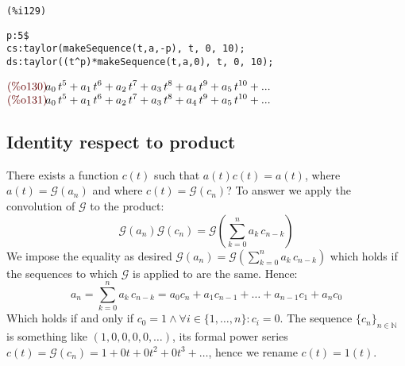 \noindent
\begin{minipage}[t]{8ex}{\color{red}\bf
\begin{verbatim}
(%i129) 
\end{verbatim}}
\end{minipage}
\begin{minipage}[t]{\textwidth}{\color{blue}
\begin{verbatim}
p:5$
cs:taylor(makeSequence(t,a,-p), t, 0, 10);
ds:taylor((t^p)*makeSequence(t,a,0), t, 0, 10);
\end{verbatim}}
\end{minipage}
\begin{math}\displaystyle
\parbox{8ex}{\color{labelcolor}(\%o130) }
{a}_{0}\,{t}^{5}+{a}_{1}\,{t}^{6}+{a}_{2}\,{t}^{7}+{a}_{3}\,{t}^{8}+{a}_{4}\,{t}^{9}+{a}_{5}\,{t}^{10}+...
\end{math}\\
\begin{math}\displaystyle
  \parbox{8ex}{\color{labelcolor}(\%o131) }
  {a}_{0}\,{t}^{5}+{a}_{1}\,{t}^{6}+{a}_{2}\,{t}^{7}+{a}_{3}\,{t}^{8}+{a}_{4}\,{t}^{9}+{a}_{5}\,{t}^{10}+...
\end{math}


\subsection{Identity respect to product}

There exists a function $c(t)$ such that $a(t)c(t)=a(t)$, where $a(t)
= \mathcal{G} (a_n)$ and where $c(t) = \mathcal{G} (c_n)$? To answer
we apply the convolution of $\mathcal{G} $ to the product:
\begin{displaymath}
  \mathcal{G} (a_n)\mathcal{G} (c_n) = \mathcal{G}\left(
    \sum_{k=0}^{n}{a}_{k}\,{c}_{n-k}\right)
\end{displaymath}
We impose the equality as desired $\mathcal{G} (a_n) = \mathcal{G}\left(
  \sum_{k=0}^{n}{a}_{k}\,{c}_{n-k}\right)$ which holds if the
sequences to which $\mathcal{G} $ is applied to are the same. Hence:
\begin{displaymath}
  a_n = \sum_{k=0}^{n}{a}_{k}\,{c}_{n-k} = a_0 c_n + a_1 c_{n-1} +
  \ldots + a_{n-1} c_1 + a_n c_0
\end{displaymath}
Which holds if and only if $c_0 = 1 \wedge \forall
i\in\{1,\ldots,n\}:c_i = 0$. The sequence $\{c_n\}_{n\in \mathbb{N} }$
is something like $(1,0,0,0,0,\ldots)$, its formal power series $c(t)
= \mathcal{G}(c_n) = 1 + 0t + 0t^2 + 0t^3 + \ldots $, hence we rename
$c(t) = 1(t)$.

